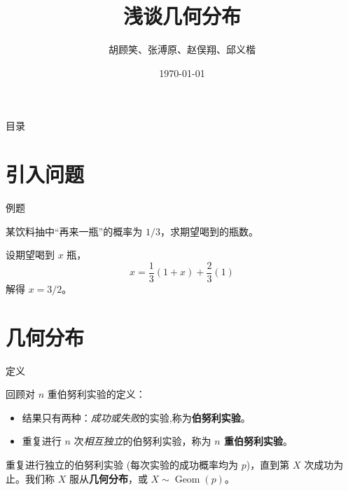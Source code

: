 \documentclass{beamer}
\newcommand{\DocumentTitle}{浅谈几何分布}
\newcommand{\DocumentAuthor}{胡顾笑、张溥原、赵俣翔、邱义楷}
\newcommand{\Geom}{\operatorname{Geom}}
\begin{document}
\title{\textbf\DocumentTitle}
\author[高二数学小组展示]{\DocumentAuthor}
\date{\today}

\maketitle

\begin{frame}{目录}
    \tableofcontents
\end{frame}

\section{引入问题}

\begin{frame}{例题}
    \begin{example}
        某饮料抽中“再来一瓶”的概率为 $1/3$，求期望喝到的瓶数。
    \end{example}
    \pause 
    \begin{solution}
        设期望喝到 $x$ 瓶，
        $$
        x = \frac 13(1 + x) + \frac23 (1)
        $$
        解得 $x = 3/2$。
    \end{solution}
\end{frame}


\section{几何分布}

\begin{frame}{定义}
    \begin{definition}
        回顾对 $n$ 重伯努利实验的定义：
        \begin{itemize}
            \item 结果只有两种：\textit{成功或失败}的实验,称为\textbf{伯努利实验}。
            \item 重复进行 $n$ 次\textit{相互独立}的伯努利实验，称为\textbf{ $n$ 重伯努利实验}。
        \end{itemize}
    \end{definition}
    \pause 
    \begin{definition}
        重复进行独立的伯努利实验 (每次实验的成功概率均为 $p$)，直到第 $X$ 次成功为止。我们称 $X$ 服从\textbf{几何分布}，或 $X \sim \Geom(p)$。
    \end{definition}
\end{frame}
\end{document}
